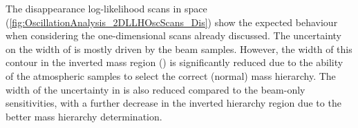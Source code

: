 
The disappearance log-likelihood scans in \text{\textendash} space (\autoref{fig:OscillationAnalysis_2DLLHOscScans_Dis}) show the expected behaviour when considering the one-dimensional scans already discussed. The uncertainty on the width of  is mostly driven by the beam samples. However, the width of this contour in the inverted mass region () is significantly reduced due to the ability of the atmospheric samples to select the correct (normal) mass hierarchy. The width of the uncertainty in  is also reduced compared to the beam-only sensitivities, with a further decrease in the inverted hierarchy region due to the better mass hierarchy determination.

